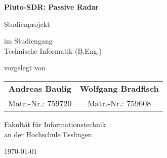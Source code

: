 \begin{titlepage}
    \begin{center}
        \vspace*{1cm}
        {\Huge \textbf{Pluto-SDR\@: Passive Radar}}

        \vspace{0.5cm}

        {\Large Studienprojekt}

        \vspace{1cm}

        

        \vspace{1cm}

        \large
        im Studiengang \\
        \Large
        Technische Informatik (B.Eng.)

        \vspace{1cm}

        \large
        vorgelegt von

        \vspace{0.25cm}

        \Large
        \begin{tabular}{c c}
            \textbf{Andreas Baulig} & \textbf{Wolfgang Bradfisch} \\
            Matr.-Nr.: 759720       & Matr.-Nr.: 759608           \\
        \end{tabular}

        \vspace{0.5cm}

        Fakultät für Informationstechnik \\
        an der Hochschule Esslingen

        \vfill

        \today

    \end{center}
\end{titlepage}
